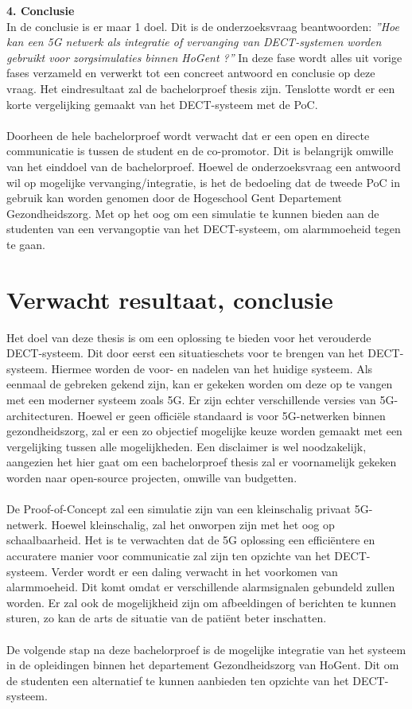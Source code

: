 \textbf{4. Conclusie}\\
In de conclusie is er maar 1 doel. Dit is de onderzoeksvraag beantwoorden: \textit{''Hoe kan een 5G netwerk als integratie of vervanging van DECT-systemen worden gebruikt voor zorgsimulaties binnen HoGent ?''} In deze fase wordt alles uit vorige fases verzameld en verwerkt tot een concreet antwoord en conclusie op deze vraag. Het eindresultaat zal de bachelorproef thesis zijn. Tenslotte wordt er een korte vergelijking gemaakt van het DECT-systeem met de PoC.
\\\\
Doorheen de hele bachelorproef wordt verwacht dat er een open en directe communicatie is tussen de student en de co-promotor. Dit is belangrijk omwille van het einddoel van de bachelorproef. Hoewel de onderzoeksvraag een antwoord wil op mogelijke vervanging/integratie, is het de bedoeling dat de tweede PoC in gebruik kan worden genomen door de Hogeschool Gent Departement Gezondheidszorg. Met op het oog om een simulatie te kunnen bieden aan de studenten van een vervangoptie van het DECT-systeem, om alarmmoeheid tegen te gaan.

\section{Verwacht resultaat, conclusie}%
\label{sec:verwachte_resultaten}

Het doel van deze thesis is om een oplossing te bieden voor het verouderde DECT-systeem. Dit door eerst een situatieschets voor te brengen van het DECT-systeem. Hiermee worden de voor- en nadelen van het huidige systeem. Als eenmaal de gebreken gekend zijn, kan er gekeken worden om deze op te vangen met een moderner systeem zoals 5G. Er zijn echter verschillende versies van 5G-architecturen. Hoewel er geen officiële standaard is voor 5G-netwerken binnen gezondheidszorg, zal er een zo objectief mogelijke keuze worden gemaakt met een vergelijking tussen alle mogelijkheden. Een disclaimer is wel noodzakelijk, aangezien het hier gaat om een bachelorproef thesis zal er voornamelijk gekeken worden naar open-source projecten, omwille van budgetten. \\\\
De Proof-of-Concept zal een simulatie zijn van een kleinschalig privaat 5G-netwerk. Hoewel kleinschalig, zal het onworpen zijn met het oog op schaalbaarheid. Het is te verwachten dat de 5G oplossing een efficiëntere en accuratere manier voor communicatie zal zijn ten opzichte van het DECT-systeem. Verder wordt er een daling verwacht in het voorkomen van alarmmoeheid. Dit komt omdat er verschillende alarmsignalen gebundeld zullen worden. Er zal ook de mogelijkheid zijn om afbeeldingen of berichten te kunnen sturen, zo kan de arts de situatie van de patiënt beter inschatten.\\\\
De volgende stap na deze bachelorproef is de mogelijke integratie van het systeem in de opleidingen binnen het departement Gezondheidszorg van HoGent. Dit om de studenten een alternatief te kunnen aanbieden ten opzichte van het DECT-systeem.